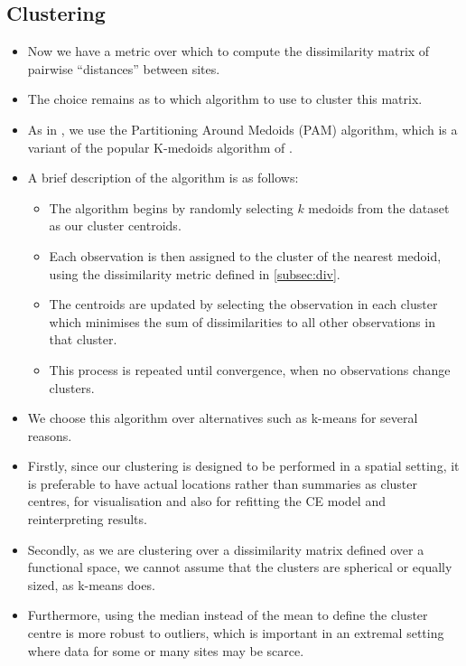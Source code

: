 \documentclass{article}
\numberwithin{equation}{section}
\begin{document}
\subsection{Clustering}


\begin{itemize}
  \item Now we have a metric over which to compute the dissimilarity matrix of pairwise ``distances'' between sites.
  \item The choice remains as to which algorithm to use to cluster this matrix. 
  \item As in \citet{Vignotto2021}, we use the Partitioning Around Medoids (PAM) algorithm, which is a variant of the popular K-medoids algorithm of \citet{Kaufman1987}.
  \item A brief description of the algorithm is as follows:
    \begin{itemize} 
      \item The algorithm begins by randomly selecting $k$ medoids from the dataset as our cluster centroids. 
      \item Each observation is then assigned to the cluster of the nearest medoid, using the dissimilarity metric defined in \ref{subsec:div}.
      \item The centroids are updated by selecting the observation in each cluster which minimises the sum of dissimilarities to all other observations in that cluster.
      \item This process is repeated until convergence, when no observations change clusters.
    \end{itemize}
  \item We choose this algorithm over alternatives such as k-means for several reasons. 
  \item Firstly, since our clustering is designed to be performed in a spatial setting, it is preferable to have actual locations rather than summaries as cluster centres, for visualisation and also for refitting the CE model and reinterpreting results. 
  \item Secondly, as we are clustering over a dissimilarity matrix defined over a functional space, we cannot assume that the clusters are spherical or equally sized, as k-means does. 
  \item Furthermore, using the median instead of the mean to define the cluster centre is more robust to outliers, which is important in an extremal setting where data for some or many sites may be scarce. 
\end{itemize}
\end{document}
